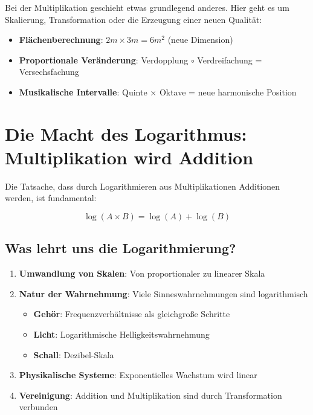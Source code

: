 	Bei der Multiplikation geschieht etwas grundlegend anderes. Hier geht es um Skalierung, Transformation oder die Erzeugung einer neuen Qualität:
	
	\begin{itemize}
		\item \textbf{Flächenberechnung}: $2m \times 3m = 6m^2$ (neue Dimension)
		\item \textbf{Proportionale Veränderung}: Verdopplung $\circ$ Verdreifachung = Versechsfachung
		\item \textbf{Musikalische Intervalle}: Quinte $\times$ Oktave = neue harmonische Position
	\end{itemize}
	
	\section{Die Macht des Logarithmus: Multiplikation wird Addition}
	
	Die Tatsache, dass durch Logarithmieren aus Multiplikationen Additionen werden, ist fundamental:
	
	\begin{equation}
		\log(A \times B) = \log(A) + \log(B)
	\end{equation}
	
	\subsection{Was lehrt uns die Logarithmierung?}
	
	\begin{enumerate}
		\item \textbf{Umwandlung von Skalen}: Von proportionaler zu linearer Skala
		\item \textbf{Natur der Wahrnehmung}: Viele Sinneswahrnehmungen sind logarithmisch
		\begin{itemize}
			\item \textbf{Gehör}: Frequenzverhältnisse als gleichgroße Schritte
			\item \textbf{Licht}: Logarithmische Helligkeitswahrnehmung
			\item \textbf{Schall}: Dezibel-Skala
		\end{itemize}
		\item \textbf{Physikalische Systeme}: Exponentielles Wachstum wird linear
		\item \textbf{Vereinigung}: Addition und Multiplikation sind durch Transformation verbunden
	\end{enumerate}
	
